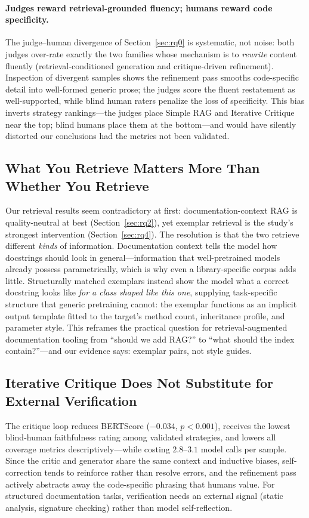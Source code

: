 \documentclass[pdflatex,sn-mathphys-ay]{sn-jnl}%
\theoremstyle{thmstyleone}%
\theoremstyle{thmstyletwo}%
\theoremstyle{thmstylethree}%
\begin{document}
\paragraph{Judges reward retrieval-grounded fluency; humans reward code specificity.}
The judge--human divergence of Section~\ref{sec:rq0} is systematic, not noise: both judges over-rate exactly the two families whose mechanism is to \emph{rewrite} content fluently (retrieval-conditioned generation and critique-driven refinement). Inspection of divergent samples shows the refinement pass smooths code-specific detail into well-formed generic prose; the judges score the fluent restatement as well-supported, while blind human raters penalize the loss of specificity. This bias inverts strategy rankings---the judges place Simple RAG and Iterative Critique near the top; blind humans place them at the bottom---and would have silently distorted our conclusions had the metrics not been validated.

\subsection{What You Retrieve Matters More Than Whether You Retrieve}
Our retrieval results seem contradictory at first: documentation-context RAG is quality-neutral at best (Section~\ref{sec:rq2}), yet exemplar retrieval is the study's strongest intervention (Section~\ref{sec:rq4}). The resolution is that the two retrieve different \emph{kinds} of information. Documentation context tells the model how docstrings should look in general---information that well-pretrained models already possess parametrically, which is why even a library-specific corpus adds little. Structurally matched exemplars instead show the model what a correct docstring looks like \emph{for a class shaped like this one}, supplying task-specific structure that generic pretraining cannot: the exemplar functions as an implicit output template fitted to the target's method count, inheritance profile, and parameter style. This reframes the practical question for retrieval-augmented documentation tooling from ``should we add RAG?'' to ``what should the index contain?''---and our evidence says: exemplar pairs, not style guides.

\subsection{Iterative Critique Does Not Substitute for External Verification}
The critique loop reduces BERTScore ($-0.034$, $p<0.001$), receives the lowest blind-human faithfulness rating among validated strategies, and lowers all coverage metrics descriptively---while costing $2.8$--$3.1$ model calls per sample. Since the critic and generator share the same context and inductive biases, self-correction tends to reinforce rather than resolve errors, and the refinement pass actively abstracts away the code-specific phrasing that humans value. For structured documentation tasks, verification needs an external signal (static analysis, signature checking) rather than model self-reflection.
\end{document}
